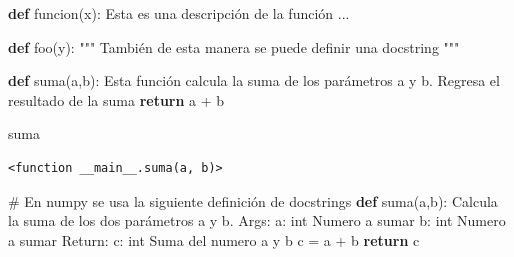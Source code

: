 \documentclass[
  spanish,
  letterpaper,
]{scrbook}
\newenvironment{Shaded}{\begin{snugshade}}{\end{snugshade}}
\newcommand{\CommentTok}[1]{\textcolor[rgb]{0.37,0.37,0.37}{#1}}
\newcommand{\ControlFlowTok}[1]{\textcolor[rgb]{0.00,0.23,0.31}{\textbf{#1}}}
\newcommand{\KeywordTok}[1]{\textcolor[rgb]{0.00,0.23,0.31}{\textbf{#1}}}
\newcommand{\NormalTok}[1]{\textcolor[rgb]{0.00,0.23,0.31}{#1}}
\newcommand{\OperatorTok}[1]{\textcolor[rgb]{0.37,0.37,0.37}{#1}}
\theoremstyle{definition}
\theoremstyle{remark}
\begin{document}
\begin{Shaded}
\begin{Highlighting}[]
\KeywordTok{def}\NormalTok{ funcion(x):}
    \CommentTok{\textquotesingle{}\textquotesingle{}\textquotesingle{}}
\CommentTok{    Esta es una descripción de la función ...}
\CommentTok{    \textquotesingle{}\textquotesingle{}\textquotesingle{}}
    
\KeywordTok{def}\NormalTok{ foo(y):}
    \CommentTok{"""}
\CommentTok{    También de esta manera se puede definir una docstring}
\CommentTok{    """}
   
\end{Highlighting}
\end{Shaded}

\begin{Shaded}
\begin{Highlighting}[]
\KeywordTok{def}\NormalTok{ suma(a,b):}
    \CommentTok{\textquotesingle{}\textquotesingle{}\textquotesingle{}}
\CommentTok{    Esta función calcula  la suma de los parámetros a y b. }
\CommentTok{    Regresa el resultado de la suma}
\CommentTok{    \textquotesingle{}\textquotesingle{}\textquotesingle{}}
    \ControlFlowTok{return}\NormalTok{ a }\OperatorTok{+}\NormalTok{ b}
\end{Highlighting}
\end{Shaded}

\begin{Shaded}
\begin{Highlighting}[]
\NormalTok{suma}
\end{Highlighting}
\end{Shaded}

\begin{verbatim}
<function __main__.suma(a, b)>
\end{verbatim}

\begin{Shaded}
\begin{Highlighting}[]
\CommentTok{\# En numpy se usa la siguiente definición de docstrings}
\KeywordTok{def}\NormalTok{ suma(a,b):}
    \CommentTok{\textquotesingle{}\textquotesingle{}\textquotesingle{}}
\CommentTok{    Calcula la suma de los dos parámetros a y b.}
\CommentTok{    }
\CommentTok{    Args: }
\CommentTok{        a: int Numero a sumar}
\CommentTok{        b: int Numero a sumar}
\CommentTok{    Return:}
\CommentTok{        c: int Suma del numero a y b}
\CommentTok{    \textquotesingle{}\textquotesingle{}\textquotesingle{}}
\NormalTok{    c }\OperatorTok{=}\NormalTok{ a }\OperatorTok{+}\NormalTok{ b}
    \ControlFlowTok{return}\NormalTok{ c}
\end{Highlighting}
\end{Shaded}
\end{document}
